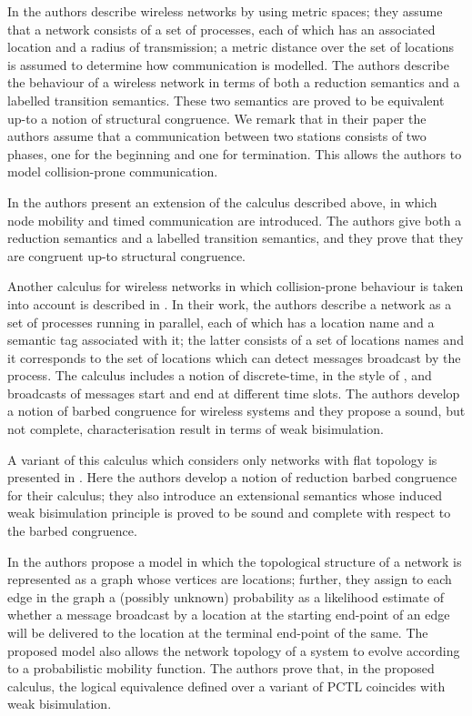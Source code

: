 \documentclass{LMCS}
\begin{document}
In \cite{LaneseS10} the authors describe wireless 
networks by using metric spaces; they assume that a network consists 
of a set of processes, each of which has an associated location 
and a radius of transmission; a metric distance over the set of locations 
is assumed to determine how communication is modelled. The authors 
describe the behaviour of a wireless network in terms of both a 
reduction semantics and a labelled transition semantics. These 
two semantics are proved to be equivalent up-to a notion of 
structural congruence. We remark that in their paper the authors 
assume that a communication between two stations consists of 
two phases, one for the beginning and one for termination. 
This allows the authors to model collision-prone communication. 

In \cite{wang} the authors present an extension of the calculus described above, 
in which node mobility and timed communication are introduced. The 
authors give both a reduction semantics and a labelled transition semantics, 
and they prove that they are congruent up-to structural congruence.

Another calculus for wireless networks in which collision-prone behaviour is taken 
into account is described in \cite{merro}. In their work, the authors 
describe a network as a set of processes running in parallel, each of 
which has a location name and a semantic tag associated with it; the latter 
consists of a set of locations names and it corresponds to the set 
of locations which can detect messages broadcast by the process. 
The calculus includes a notion of discrete-time, in the style of 
\cite{HenReg95}, and broadcasts of messages start and end at different 
time slots. The authors develop a notion of barbed congruence for 
wireless systems and they 
propose a sound, but not complete, characterisation result in terms 
of weak bisimulation. 

A variant of this calculus which considers only networks with 
flat topology is presented in \cite{CHM12}. Here the 
authors develop a notion of reduction barbed congruence for their 
calculus; they 
also introduce an extensional semantics whose induced weak 
bisimulation principle is proved to be sound and complete 
with respect to the barbed congruence.

In \cite{GodSon} the authors propose a model in which the topological 
structure of a network is represented as a graph whose vertices are 
locations; further, they assign 
to each edge in the graph a (possibly unknown) probability as a likelihood estimate of 
whether a message broadcast by a location at the starting end-point of an 
edge will be delivered to the location at the terminal end-point of the same. 
The proposed model also allows the network topology of a system to 
evolve according to a probabilistic mobility function. 
The authors prove that, in the proposed calculus, the logical equivalence 
defined over a variant of PCTL coincides with weak bisimulation. 
\end{document}
